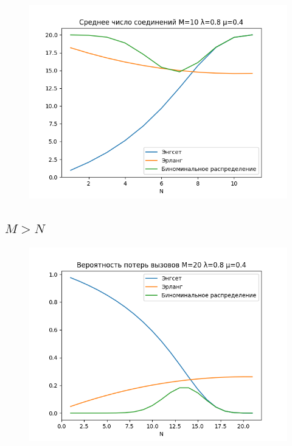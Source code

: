 \documentclass[12pt]{article}
\let\Oldsubsection\subsection
\renewcommand{\subsection}{\FloatBarrier\Oldsubsection}
\begin{document}
\begin{figure}[!htb]
\centering
\includegraphics[scale=1.00]{assets/iss_4/aver_conn_M10_lam08_mu04.png}
\caption{}
\label{}
\end{figure}

\subsection{$M > N$}\label{subsec2:}
\begin{figure}[!htb]
\centering
\includegraphics[scale=1.00]{assets/iss_4/loss_prob_M20_lam08_mu04.png}
\caption{}
\label{}
\end{figure}
\end{document}
